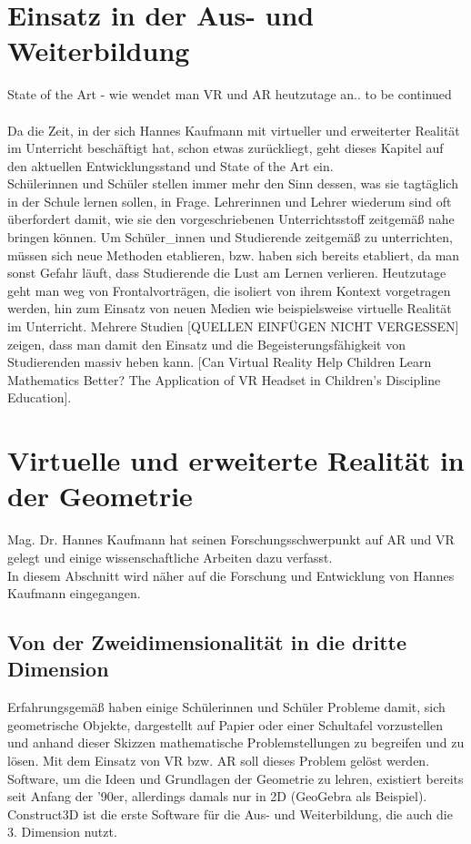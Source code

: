 \documentclass[deutsch]{llncs}
\begin{document}
\section{Einsatz in der Aus- und Weiterbildung}
\label{sec:typo}
State of the Art - wie wendet man VR und AR heutzutage an.. to be continued \\
\noindent \\
Da die Zeit, in der sich Hannes Kaufmann mit virtueller und erweiterter Realität im Unterricht beschäftigt hat, schon etwas zurückliegt, geht dieses Kapitel auf den aktuellen Entwicklungsstand und State of the Art ein. \\
Schülerinnen und Schüler stellen immer mehr den Sinn dessen, was sie tagtäglich in der Schule lernen sollen, in Frage. Lehrerinnen und Lehrer wiederum sind oft überfordert damit, wie sie den vorgeschriebenen Unterrichtsstoff zeitgemäß nahe bringen können. Um Schüler\_innen und Studierende zeitgemäß zu unterrichten, müssen sich neue Methoden etablieren, bzw. haben sich bereits etabliert, da man sonst Gefahr läuft, dass Studierende die Lust am Lernen verlieren. Heutzutage geht man weg von Frontalvorträgen, die isoliert von ihrem Kontext vorgetragen werden, hin zum Einsatz von neuen Medien wie beispielsweise virtuelle Realität im Unterricht. Mehrere Studien [QUELLEN EINFÜGEN NICHT VERGESSEN] zeigen, dass man damit den Einsatz und die Begeisterungsfähigkeit von Studierenden massiv heben kann.
\cite{2}
[Can Virtual Reality Help Children Learn Mathematics Better? The Application of VR Headset in Children’s Discipline Education].

\section{Virtuelle und erweiterte Realität in der Geometrie}
\label{sec:typo}
Mag. Dr. Hannes Kaufmann hat seinen Forschungsschwerpunkt auf AR und VR gelegt und einige wissenschaftliche Arbeiten dazu verfasst. \\
In diesem Abschnitt wird näher auf die Forschung und Entwicklung von Hannes Kaufmann eingegangen. 
\noindent \\
\subsection{Von der Zweidimensionalität in die dritte Dimension}
\label{subsec:}
Erfahrungsgemäß haben einige Schülerinnen und Schüler Probleme damit, sich geometrische Objekte, dargestellt auf Papier oder einer Schultafel vorzustellen und anhand dieser Skizzen mathematische Problemstellungen zu begreifen und zu lösen. Mit dem Einsatz von VR bzw. AR soll dieses Problem gelöst werden.\\
Software, um die Ideen und Grundlagen der Geometrie zu lehren, existiert bereits seit Anfang der '90er, allerdings damals nur in 2D (GeoGebra als Beispiel). \\
Construct3D ist die erste Software für die Aus- und Weiterbildung, die auch die 3. Dimension nutzt.
\end{document}
